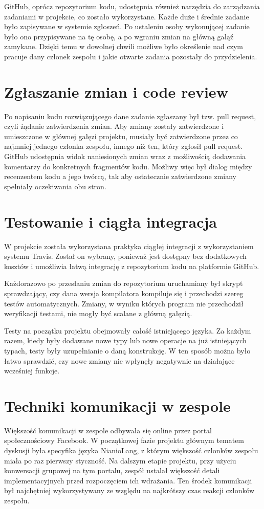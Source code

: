 \documentclass[licencjacka]{pracamgr}
\begin{document}
GitHub, oprócz repozytorium kodu, udostępnia również narzędzia do zarządzania zadaniami
w projekcie, co zostało wykorzystane. Każde duże i średnie zadanie było zapisywane
w systemie zgłoszeń. Po ustaleniu osoby wykonującej zadanie było ono przypisywane
na tę osobę, a po wgraniu zmian na główną gałąź zamykane.
Dzięki temu w dowolnej chwili możliwe było określenie nad czym pracuje dany członek
zespołu i jakie otwarte zadania pozostały do przydzielenia.

\section{Zgłaszanie zmian i code review}
Po napisaniu kodu rozwiązującego dane zadanie zgłaszany był tzw. pull request,
czyli żądanie zatwierdzenia zmian. Aby zmiany zostały zatwierdzone i umieszczone
w głównej gałęzi projektu, musiały być zatwierdzone przez co najmniej jednego członka
zespołu, innego niż ten, który zgłosił pull request. GitHub udostępnia widok naniesionych zmian
wraz z możliwością dodawania komentarzy do konkretnych fragmentów kodu. Możliwy więc
był dialog między recenzentem kodu a jego twórcą, tak aby ostatecznie zatwierdzone
zmiany spełniały oczekiwania obu stron.

\section{Testowanie i ciągła integracja}
W projekcie została wykorzystana praktyka ciągłej integracji z wykorzystaniem systemu Travis.
Został on wybrany, ponieważ jest dostępny bez dodatkowych kosztów i umożliwia łatwą integrację z repozytorium kodu
na platformie GitHub.

Każdorazowo po przesłaniu zmian do repozytorium uruchamiany był skrypt sprawdzający, czy dana wersja kompilatora
kompiluje się i przechodzi szereg testów automatycznych.
Zmiany, w wyniku których program nie przechodził weryfikacji testami, nie mogły być scalane z główną gałęzią.

Testy na początku projektu obejmowały całość istniejącego języka.
Za każdym razem, kiedy były dodawane nowe typy lub nowe operacje na już istniejących typach,
testy były uzupełnianie o daną konstrukcję.
W ten sposób można było łatwo sprawdzić, czy nowe zmiany nie wpłynęły negatywnie na działające wcześniej funkcje.

\section{Techniki komunikacji w zespole}
Większość komunikacji w zespole odbywała się online przez portal społecznościowy Facebook.
W początkowej fazie projektu głównym tematem dyskusji była specyfika języka NianioLang,
z którym większość członków zespołu miała po raz pierwszy styczność.
Na dalszym etapie projektu, przy użyciu konwersacji grupowej na tym portalu, zespół
ustalał większość detali implementacyjnych przed rozpoczęciem ich wdrażania.
Ten środek komunikacji był najchętniej wykorzystywany ze względu na najkrótszy czas
reakcji członków zespołu.
\end{document}
